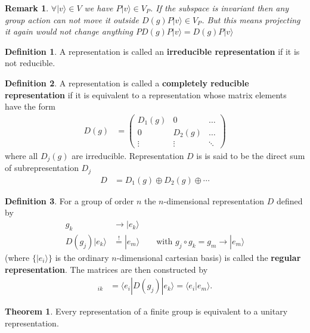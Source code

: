 \documentclass[10pt,a4paper]{article}
\newtheorem{remark}{Remark}[section]
\theoremstyle{definition}
\newtheorem{definition}{Definition}[section]
\newtheorem{theorem}{Theorem}[section]
\begin{document}
\begin{remark}{}
$\forall |v\rangle\in V$ we have $P|v\rangle\in V_P$. If the subspace is invariant then any group action can not move it outside $D(g)P|v\rangle\in V_P$. But this means projecting it again would not change anything $PD(g)P|v\rangle = D(g)P|v\rangle$
\end{remark}

\begin{definition}{}
A representation is called an {\bf irreducible representation} if it is not reducible.
\end{definition}

\begin{definition}{}
A representation is called a {\bf completely reducible representation} if it is equivalent to a representation whose matrix elements have the form
\begin{align}
D(g)&=\left(
\begin{array}{ccc}
D_1(g) & 0      & \dots \\
0      & D_2(g) & \dots \\
\vdots & \vdots & \ddots
\end{array}
\right)
\end{align}
where all $D_j(g)$ are irreducible. Representation $D$ is is said to be the direct sum of subrepresentation $D_j$
\begin{align}
D&=D_1(g)\oplus D_2(g)\oplus\dotsi
\end{align}
\end{definition}

\begin{definition}{}
For a group of order $n$ the $n$-dimensional representation $D$ defined by 
\begin{align}
g_k&\rightarrow|e_k\rangle\\
D(g_j)|e_k\rangle&\overset{!}{=}|e_m\rangle\qquad\text{with } g_j\circ g_k=g_m\rightarrow|e_m\rangle
\end{align}
(where $\{|e_i\rangle\}$ is the ordinary $n$-dimensional cartesian basis) is called the {\bf regular representation}. The matrices are then constructed by
\begin{align}
[D(g_j)]_{ik}&=\langle e_i|D(g_j)|e_k\rangle=\langle e_i|e_m\rangle.
\end{align}
\end{definition}

\begin{theorem}
Every representation of a finite group is equivalent to a unitary representation.
\end{theorem}
\end{document}
